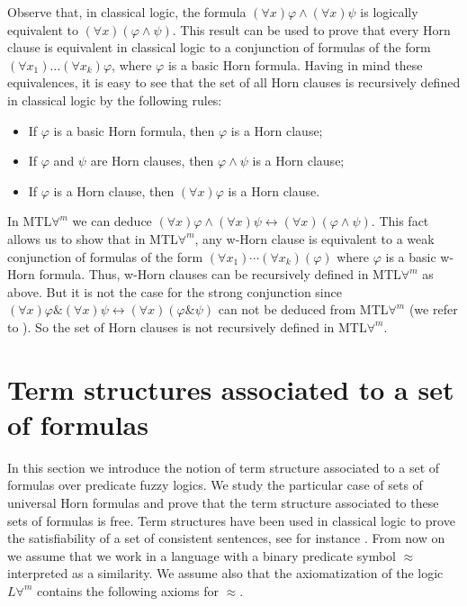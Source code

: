 \documentclass{IOS-Book-Article}
\begin{document}
Observe that, in classical logic, the formula $(\forall x)\varphi \wedge (\forall x) \psi$ is logically equivalent to $(\forall x)(\varphi \wedge \psi).$ This result can be used to prove that every Horn clause is equivalent in classical logic to a conjunction of formulas of the form $(\forall x_1) \ldots (\forall x_k)\varphi$, where $\varphi$ is a basic Horn formula. Having in mind these equivalences, it is easy to see that the set of all Horn clauses is recursively defined in classical logic by the following rules: \begin{itemize}

\item[1.] If $\varphi$  is a basic Horn formula, then $\varphi$ is a Horn clause;


\item[2.] If $\varphi$ and $\psi$ are Horn clauses, then $\varphi\wedge\psi$ is a Horn clause;

\item[3.]  If $\varphi$  is a Horn clause, then $(\forall x)\varphi$ is a Horn clause.

\end{itemize}

In MTL$\forall^m$ we can deduce $(\forall x)\varphi \wedge (\forall x) \psi\leftrightarrow(\forall x)(\varphi \wedge \psi)$. This fact allows us to show that in MTL$\forall^m$, any w-Horn clause is equivalent to a weak conjunction of formulas of the form $(\forall x_1)\dotsb(\forall x_k)(\varphi)$ where $\varphi$ is a basic w-Horn formula. Thus, w-Horn clauses can be recursively defined in MTL$\forall^m$ as above. But it is not the case for the strong conjunction since $(\forall x)\varphi \& (\forall x) \psi\leftrightarrow(\forall x)(\varphi \& \psi)$ can not be deduced from MTL$\forall^m$ (we refer to \cite[Remark p.281]{EsGo01}). So the set of Horn clauses is not recursively defined in MTL$\forall^m$. 


 
\section{Term structures associated to a set of formulas} 
\label{Term structure associated to a set of formulas}

In this section we introduce the notion of term structure associated to a set of formulas over predicate fuzzy logics. We study the particular case of sets of universal Horn formulas and prove that the term structure associated to these sets of formulas is free. Term structures have been used in classical logic to prove the satisfiability of a set of consistent sentences, see for instance \cite[Ch.5]{EbiFlu94}. From now on we assume that we work in a language with a binary predicate symbol $\approx$ interpreted as a similarity. We assume also that the axiomatization of the logic $L\forall^m$ contains the following axioms for $\approx$.
\end{document}
